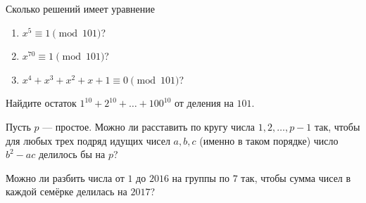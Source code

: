 \documentclass{article}
\begin{document}
\begin{enumerate_boxed}
        \item Сколько решений имеет уравнение
        \begin{enumerate}
            \item $x^5 \equiv 1 \pmod{101}$?
            \item $x^{70} \equiv 1 \pmod{101}$?
            \item $x^4 + x^3 + x^2 + x + 1 \equiv 0 \pmod{101}$?
        \end{enumerate}

        \item Найдите остаток $1^{10} + 2^{10} + \ldots + 100^{10}$ от деления на $101$.

        \item Пусть $p$ — простое.
        Можно ли расставить по кругу числа $1, 2, \ldots, p - 1$ так, чтобы для любых трех подряд идущих чисел $a, b, c$ (именно в таком порядке) число $b^2 - ac$ делилось бы на $p$?

        \item Можно ли разбить числа от $1$ до $2016$ на группы по $7$ так, чтобы сумма чисел в каждой семёрке делилась на $2017$?

    \end{enumerate_boxed}
\end{document}
